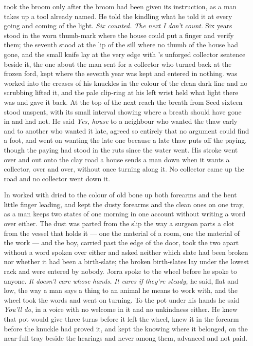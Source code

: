  took the broom only after the broom had been given its instruction, as a man takes up a tool already named. He told the kindling what he told it at every going and coming of the light. \emph{Six counted. The next I don't count.} Six years stood in the worn thumb-mark where the house could put a finger and verify them; the seventh stood at the lip of the sill where no thumb of the house had gone, and the small knife lay at the very edge with 's unforged collector sentence beside it, the one about the man sent for a collector who turned back at the frozen ford, kept where the seventh year was kept and entered in nothing.  was worked into the creases of his knuckles in the colour of the clean dark line and no scrubbing lifted it, and the pale clip-ring at his left wrist held what light there was and gave it back. At the top of the next reach the breath from Seed sixteen stood unspent, with its small interval showing where a breath should have gone in and had not. He said \emph{Yes, house} to a neighbour who wanted the thaw early and to another who wanted it late, agreed so entirely that no argument could find a foot, and went on wanting the late one because a late thaw puts off the paying, though the paying had stood in the ruts since the water went. His stroke went over  and out onto the clay road a house sends a man down when it wants a collector, over and over, without once turning along it. No collector came up the road and no collector went down it.

\scenebreak

In   worked with  dried to the colour of old bone up both forearms and the bent little finger leading, and kept the dusty forearms and the clean ones on one tray, as a man keeps two states of one morning in one account without writing a word over either. The dust was parted from the slip the way a surgeon parts a clot from the vessel that holds it --- one the material of a room, one the material of the work --- and the boy, carried past the edge of the door, took the two apart without a word spoken over either and asked neither which slate had been broken nor whether it had been a birth-slate; the broken birth-slates lay under the lowest rack and were entered by nobody. Jorra spoke to the wheel before he spoke to anyone. \emph{It doesn't care whose hands. It cares if they're steady,} he said, flat and low, the way a man says a thing to an animal he means to work with, and the wheel took the words and went on turning. To the pot under his hands he said \emph{You'll do}, in a voice with no welcome in it and no unkindness either. He knew  that pot would give three turns before it left the wheel, knew it in the forearm before the knuckle had proved it, and kept the knowing where it belonged, on the near-full tray beside the hearings and never among them, advanced and not paid.

